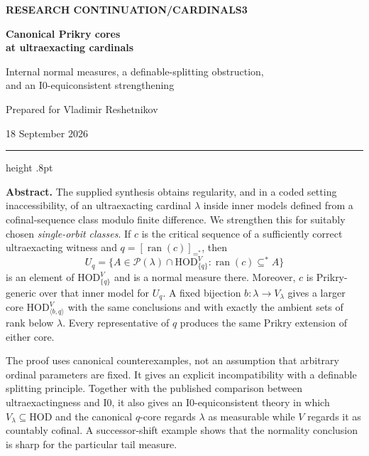 \documentclass[11pt,letterpaper]{article}
\theoremstyle{definition}
\newcommand{\HOD}{\mathrm{HOD}}
\newcommand{\ran}{\operatorname{ran}}
\newcommand{\Pow}{\mathcal P}
\newcommand{\Izero}{\mathrm I0}
\begin{document}
\begin{titlepage}
\thispagestyle{empty}
\vspace*{.2in}
{\sffamily\bfseries\color{Olive}\fontsize{11}{14}\selectfont RESEARCH CONTINUATION\quad /\quad CARDINALS3\par}
\vspace{.22in}
{\color{Forest}\bfseries\fontsize{28}{31}\selectfont Canonical Prikry cores\\at ultraexacting cardinals\par}
\vspace{.20in}
{\color{Forest}\fontsize{14}{18}\selectfont Internal normal measures, a definable-splitting obstruction,\\and an $\Izero$-equiconsistent strengthening\par}
\vspace{.22in}
{\color{Muted}Prepared for Vladimir Reshetnikov\par}
{\color{Muted}18 September 2026\par}
\vspace{.18in}
{\color{Sage}\hrule height .8pt}
\vspace{.18in}
\textbf{Abstract.}
The supplied synthesis obtains regularity, and in a coded setting inaccessibility, of an ultraexacting cardinal $\lambda$ inside inner models defined from a cofinal-sequence class modulo finite difference. We strengthen this for suitably chosen \emph{single-orbit classes}. If $c$ is the critical sequence of a sufficiently correct ultraexacting witness and $q=[\ran(c)]_{=^*}$, then
\[
 U_q=\{A\in\Pow(\lambda)\cap\HOD_{\{q\}}^V:
             \ran(c)\subseteq^* A\}
\]
is an element of $\HOD_{\{q\}}^V$ and is a normal measure there. Moreover, $c$ is Prikry-generic over that inner model for $U_q$. A fixed bijection $b:\lambda\to V_\lambda$ gives a larger core $\HOD_{\langle b,q\rangle}^V$ with the same conclusions and with exactly the ambient sets of rank below $\lambda$. Every representative of $q$ produces the same Prikry extension of either core.

The proof uses canonical counterexamples, not an assumption that arbitrary ordinal parameters are fixed. It gives an explicit incompatibility with a definable splitting principle. Together with the published comparison between ultraexactingness and $\Izero$, it also gives an $\Izero$-equiconsistent theory in which $V_\lambda\subseteq\HOD$ and the canonical $q$-core regards $\lambda$ as measurable while $V$ regards it as countably cofinal. A successor-shift example shows that the normality conclusion is sharp for the particular tail measure.


\end{titlepage}
\end{document}
